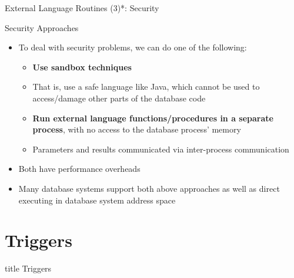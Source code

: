 \documentclass[aspectratio=169, xcolor=dvipsnames]{beamer}
\begin{document}
\begin{frame}{External Language Routines (3)*: Security}
    \begin{block}{Security Approaches}
        \begin{itemize}[<+->]
            \item To deal with security problems, we can do one of the following:
            \begin{itemize}
                \item[$\triangleright$] \textbf{Use sandbox techniques}
                \item[$\triangleright$] That is, use a safe language like Java, which cannot be used to access/damage other parts of the database code
                \item[$\triangleright$] \textbf{Run external language functions/procedures in a separate process}, with no access to the database process' memory
                \item[$\triangleright$] Parameters and results communicated via inter-process communication
            \end{itemize}
            \item Both have performance overheads
            \item Many database systems support both above approaches as well as direct executing in database system address space
        \end{itemize}
    \end{block}
\end{frame}

\section{Triggers}

\begin{frame}
  \vfill
  \centering
  \begin{beamercolorbox}[sep=8pt,center,shadow=true,rounded=true]{title}
    Triggers\par%
  \end{beamercolorbox}
  \vfill
\end{frame}
\end{document}
